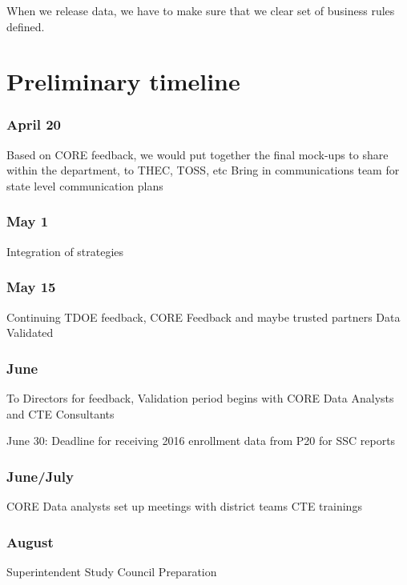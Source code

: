 \documentclass[11pt,]{article}
\begin{document}
When we release data, we have to make sure that we clear set of business
rules defined.

\section{Preliminary timeline}\label{preliminary-timeline}

\subsubsection{April 20}\label{april-20}

Based on CORE feedback, we would put together the final mock-ups to
share within the department, to THEC, TOSS, etc Bring in communications
team for state level communication plans

\subsubsection{May 1}\label{may-1}

Integration of strategies

\subsubsection{May 15}\label{may-15}

Continuing TDOE feedback, CORE Feedback and maybe trusted partners Data
Validated

\subsubsection{June}\label{june}

To Directors for feedback, Validation period begins with CORE Data
Analysts and CTE Consultants

June 30: Deadline for receiving 2016 enrollment data from P20 for SSC
reports

\subsubsection{June/July}\label{junejuly}

CORE Data analysts set up meetings with district teams CTE trainings

\subsubsection{August}\label{august}

Superintendent Study Council Preparation
\end{document}
